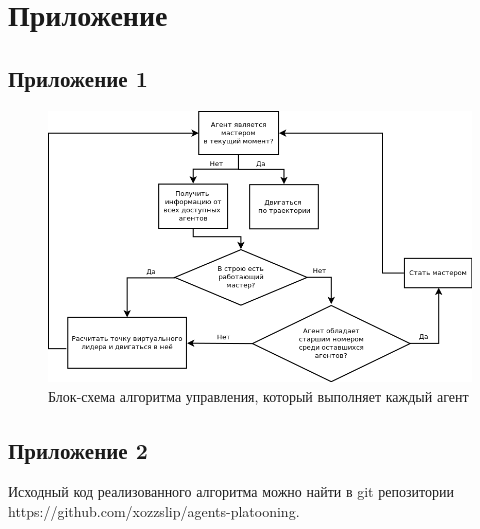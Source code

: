 \documentclass[a4paper, 14pt]{extarticle}
\begin{document}
\section*{Приложение}
\subsection*{Приложение 1}
\begin{figure}[!h]
	\centering
	\includegraphics[width=1\linewidth]{others/algo-dia}
	\caption{Блок-схема алгоритма управления, который выполняет каждый агент}
	\label{fig:algo-dia}
\end{figure}
\subsection*{Приложение 2}
Исходный код реализованного алгоритма можно найти в git репозитории https://github.com/xozzslip/agents-platooning. 
\end{document}
